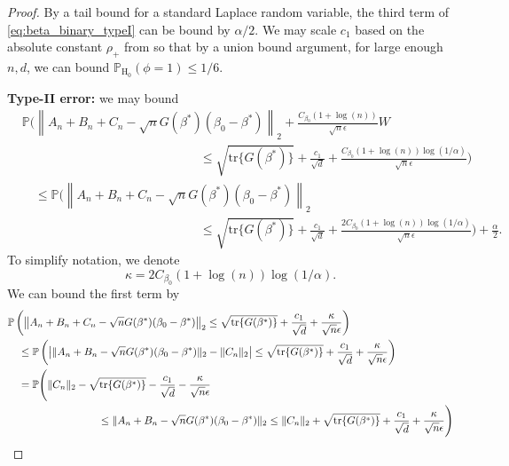 \documentclass[11pt]{article}
\begin{document}
\begin{proof}
 By a tail bound for a standard Laplace random variable, the third term of \eqref{eq:beta_binary_typeI} can be bound by $\alpha/2$. We may scale $c_1$ based on the absolute constant $\rho_+$ from  so that by a union bound argument, for large enough $n, d$, we can bound $\mathbb{P}_{\mathrm{H}_0}(\phi=1) \leq 1/6$.  

\bigskip
\noindent \textbf{Type-II error:} we may bound 
\begin{align*}
    &\mathbb{P} \Bigg( \left\|A_n + B_n + C_n - \sqrt{n}G(\beta^*)(\beta_0-\beta^*) \right\|_2 + \frac{C_{\beta_0}(1+\log(n))}{\sqrt{n} \epsilon}W \\
    &\hspace{6cm}\leq \sqrt{\mathrm{tr}\{G(\beta^*)\}} + \frac{c_1}{\sqrt{d}} + \frac{C_{\beta_0}(1+\log(n)) \log(1/\alpha)}{\sqrt{n} \epsilon} \Bigg) \\
    &\quad \leq \mathbb{P} \Bigg( \left\|A_n + B_n + C_n - \sqrt{n}G(\beta^*)(\beta_0 - \beta^*) \right\|_2 \\
    &\hspace{6cm} \leq \sqrt{\mathrm{tr}\{G(\beta^*)\}} + \frac{c_1}{\sqrt{d}} + \frac{2C_{\beta_0}(1+\log(n)) \log(1/\alpha)}{\sqrt{n} \epsilon} \Bigg) + \frac{\alpha}{2}.  
\end{align*}
To simplify notation, we denote 
\begin{equation}
    \kappa = 2C_{\beta_0} (1+\log(n))\log(1/\alpha).
    \label{eq:kappa_notation}
\end{equation}
We can bound the first term by
\begin{align}
    &\mathbb{P}\left(\left\|A_n + B_n + C_n - \sqrt{n}G(\beta^*)(\beta_0-\beta^*) \right\|_2 \leq \sqrt{\mathrm{tr}\{G(\beta^*)\}} + \frac{c_1}{\sqrt{d}} + \frac{\kappa}{\sqrt{n} \epsilon}\right) \notag\\
    &\quad \leq \mathbb{P}\left( \left|\|A_n + B_n - \sqrt{n} G(\beta^*)(\beta_0 - \beta^*)\|_2 - \|C_n\|_2 \right| \leq  \sqrt{\mathrm{tr}\{G(\beta^*)\}} + \frac{c_1}{\sqrt{d}} + \frac{\kappa}{\sqrt{n} \epsilon} \right) \notag\\
    & \quad= \mathbb{P}\Bigg(\|C_n\|_2  - \sqrt{\mathrm{tr}\{G(\beta^*)\}} - \frac{c_1}{\sqrt{d}} - \frac{\kappa}{\sqrt{n} \epsilon}  \notag \\
    &\hspace{3cm} \leq \|A_n + B_n - \sqrt{n} G(\beta^*)(\beta_0 - \beta^*)\|_2 \leq \|C_n\|_2 + \sqrt{\mathrm{tr}\{G(\beta^*)\}} + \frac{c_1}{\sqrt{d}} + \frac{\kappa}{\sqrt{n} \epsilon} \Bigg) \notag\\

\end{align}
\end{proof}
\end{document}
